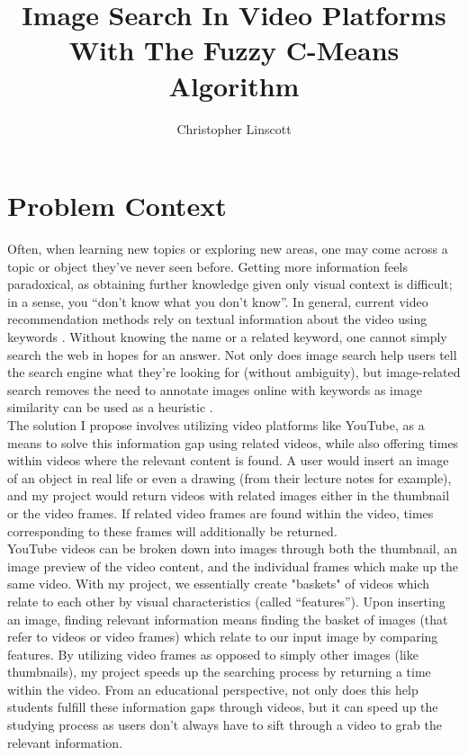 \documentclass[10pt,twocolumn]{article}
\title{Image Search In Video Platforms With The Fuzzy C-Means Algorithm}
\author{Christopher Linscott}
\affiliation{Occidental College}
\begin{document}
\maketitle


\section{Problem Context}

Often, when learning new topics or exploring new areas, one may come across a topic or object they’ve never seen before. Getting more information feels paradoxical, as obtaining further knowledge given only visual context is difficult; in a sense, you “don’t know what you don’t know”. In general, current video recommendation methods rely on textual information about the video using keywords \cite{Stanford2021}. Without knowing the name or a related keyword, one cannot simply search the web in hopes for an answer. Not only does image search help users tell the search engine what they’re looking for (without ambiguity), but image-related search removes the need to annotate images online with keywords as image similarity can be used as a heuristic \cite{Adrakatti2016}. \\
\indent The solution I propose involves utilizing video platforms like YouTube, as a means to solve this information gap using related videos, while also offering times within videos where the relevant content is found. A user would insert an image of an object in real life or even a drawing (from their lecture notes for example), and my project would return videos with related images either in the thumbnail or the video frames. If related video frames are found within the video, times corresponding to these frames will additionally be returned. \\
\indent YouTube videos can be broken down into images through both the thumbnail, an image preview of the video content, and the individual frames which make up the same video. With my project, we essentially create "baskets" of videos which relate to each other by visual characteristics (called “features”). Upon inserting an image, finding relevant information means finding the basket of images (that refer to videos or video frames) which relate to our input image by comparing features. By utilizing video frames as opposed to simply other images (like thumbnails), my project speeds up the searching process by returning a time within the video. From an educational perspective, not only does this help students fulfill these information gaps through videos, but it can speed up the studying process as users don’t always have to sift through a video to grab the relevant information.
\end{document}
